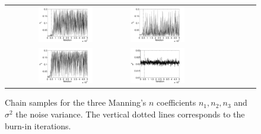 \begin{figure}[ht]
\begin{tabular}{clc}
\includegraphics[width=0.475\textwidth]{./figures/chain_p1.pdf} &
\includegraphics[width=0.475\textwidth]{./figures/chain_p2.pdf} \\
\includegraphics[width=0.475\textwidth]{./figures/chain_p3.pdf} &
\includegraphics[width=0.475\textwidth]{./figures/chain_s1.pdf}
\end{tabular}
\caption{Chain samples for the three Manning's $n$ coefficients $n_1,n_2,n_3$ and $\sigma^2$
the noise variance. The vertical dotted lines corresponds to the
burn-in iterations.}
\label{fig:mcmc} 
\end{figure}

